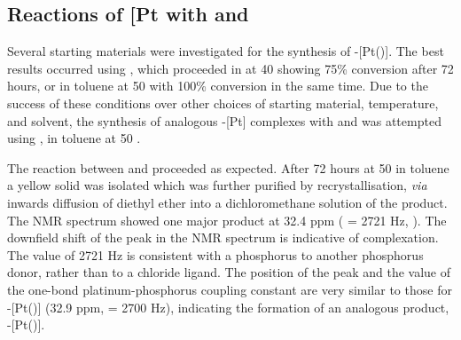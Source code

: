 
\subsection[Reactions with \texorpdfstring{[Pt\ce{(C6H10)Cl2}{]}} P]{Reactions of \texorpdfstring{[Pt\ce{(C6H10)Cl2}{]}} P with \tBusixantphos{} and \tBuxantphos{}}

Several starting materials were investigated for the synthesis of \trans-[Pt(\tButhixantphos)]. The best results occurred using \ce{[Pt(C6H10)Cl2]}, which proceeded in  at 40 \degC{} showing 75\% conversion after 72 hours, or in toluene at 50\degC{} with 100\% conversion in the same time.  Due to the success of these conditions over other choices of starting material, temperature, and solvent, the synthesis of analogous \trans-[Pt] complexes with \tBusixantphos{} and \tBuxantphos{} was attempted using \ce{[Pt(C6H10)Cl2]}, in toluene at 50 \degC{}.  

The reaction between \tBuxantphos{} and \ce{[Pt(C6H10)Cl2]} proceeded as expected.  After 72 hours at 50\degC{} in toluene a yellow solid was isolated which was further purified by recrystallisation, \emph{via} inwards diffusion of diethyl ether into a dichloromethane solution of the product.  The \phosphorus{} NMR spectrum showed one major product at 32.4 ppm (\JPtP{} = 2721 Hz, ).  The downfield shift of the peak in the \phosphorus{} NMR spectrum is indicative of complexation.   The value of 2721 Hz is consistent with a phosphorus \trans{} to another phosphorus donor, rather than \trans{} to a chloride ligand.\cite{Rigamonti2010, Appleton1978, Pregosin1980}  The position of the peak and the value of the one-bond platinum-phosphorus coupling constant are very similar to those for \trans-[Pt(\tButhixantphos)] (32.9 ppm, \JPtP{} = 2700 Hz), indicating the formation of an analogous product, \trans-[Pt(\tBuxantphos)].

